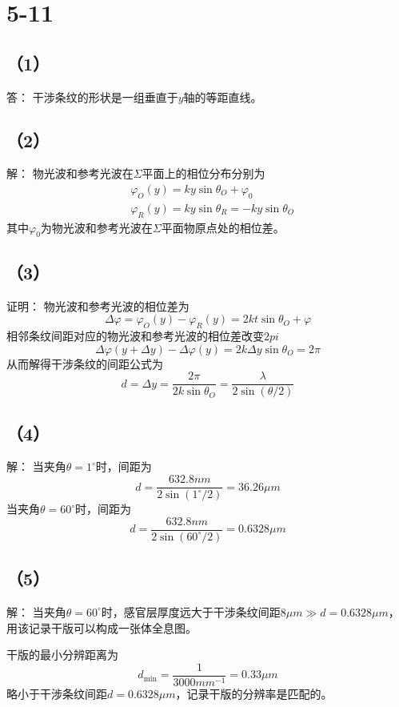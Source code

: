 \documentclass[10pt,a4paper]{article}
\begin{document}
\section*{5-11}
\subsection*{（1）}答：
干涉条纹的形状是一组垂直于$y$轴的等距直线。
\subsection*{（2）}解：
物光波和参考光波在$\Sigma$平面上的相位分布分别为
\begin{align*}
&\varphi_O(y)=ky\sin\theta_O+\varphi_0\\
&\varphi_R(y)=ky\sin\theta_R=-ky\sin\theta_O
\end{align*}
其中$\varphi_0$为物光波和参考光波在$\Sigma$平面物原点处的相位差。
\subsection*{（3）}证明：
物光波和参考光波的相位差为
\[
\Delta\varphi=\varphi_O(y)-\varphi_R(y)=2kt\sin\theta_O+\varphi
\]
相邻条纹间距对应的物光波和参考光波的相位差改变$2pi$
\[
\Delta\varphi(y+\Delta y)-\Delta\varphi(y)=2k\Delta y\sin\theta_O=2\pi
\]
从而解得干涉条纹的间距公式为
\[
d=\Delta y=\frac{2\pi}{2k\sin\theta_O}=\frac{\lambda}{2\sin(\theta/2)}
\]
\subsection*{（4）}解：
当夹角$\theta=1^{\circ}$时，间距为
\[
d=\frac{632.8nm}{2\sin(1^{\circ}/2)}=36.26\mu m
\]
当夹角$\theta=60^{\circ}$时，间距为
\[
d=\frac{632.8nm}{2\sin(60^{\circ}/2)}=0.6328\mu m
\]
\subsection*{（5）}解：
当夹角$\theta=60^{\circ}$时，感官层厚度远大于干涉条纹间距$8\mu m\gg d=0.6328\mu m$，用该记录干版可以构成一张体全息图。

干版的最小分辨距离为
\[
d_{\min}=\frac{1}{3000mm^{-1}}=0.33\mu m
\]
略小于干涉条纹间距$d=0.6328\mu m$，记录干版的分辨率是匹配的。
\end{document}
